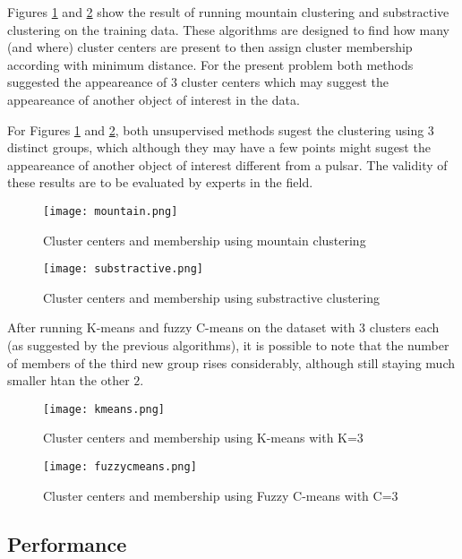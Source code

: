 Figures \ref{fig:mountain} and \ref{fig:substractive} show the result of running
mountain clustering and substractive clustering on the training data. These
algorithms are designed to find how many (and where) cluster centers are
present to then assign cluster membership according with minimum
distance. For the present problem both methods suggested the appeareance of 3
cluster centers which may suggest the appeareance of another object of interest
in the data.

For Figures \ref{fig:mountain} and \ref{fig:substractive}, both unsupervised
methods sugest the clustering using 3 distinct groups, which although they may
have a few points might sugest the appeareance of another object of interest
different from a pulsar. The validity of these results are to be evaluated by
experts in the field.

\begin{figure}[t]
    \texttt{[image: mountain.png]}
    \caption{Cluster centers and membership using mountain clustering
    \label{fig:mountain}}
\end{figure}
\begin{figure}[t]
    \texttt{[image: substractive.png]}
    \caption{Cluster centers and membership using substractive clustering
    \label{fig:substractive}}
\end{figure}

After running K-means and fuzzy C-means on the dataset with $3$ clusters each
(as suggested by the previous algorithms), it is possible to note that the
number of members of the third new group rises considerably, although still
staying much smaller htan the other $2$.

\begin{figure}[t]
    \texttt{[image: kmeans.png]}
    \caption{Cluster centers and membership using K-means with K=3
    \label{fig:kmeans}}
\end{figure}
\begin{figure}[t]
    \texttt{[image: fuzzycmeans.png]}
    \caption{Cluster centers and membership using Fuzzy C-means with C=3 
    \label{fig:fuzzycmeans}}
\end{figure}

\subsection{Performance}

